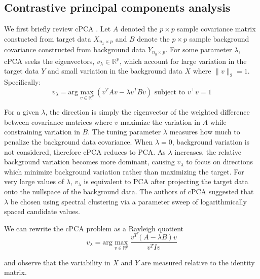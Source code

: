 \documentclass[12pt]{article}
\begin{document}
\subsection{Contrastive principal components analysis}
We first briefly review cPCA \cite{Abid}. Let $A$ denoted the $p\times p$ sample covariance matrix constucted from target data $X_{n_x \times p}$ and $B$ denote the $p\times p$ sample background covariance constructed from background data $Y_{n_y \times p}$. For some parameter $\lambda$, cPCA seeks the eigenvectors, $v_\lambda \in \mathbb{R}^p$, which account for large variation in the target data $Y$ and small variation in the background data $X$ where $\|v\|_2 = 1$. Specifically:  
\[v_\lambda = \text{arg}\max_{v \in \mathbb{R}^p}{\left(v^TAv - \lambda v^TBv\right)} \mbox{ subject to } v^\top  v = 1 \]

For a given $\lambda$, the direction is simply the eigenvector of the weighted difference between covariance matrices where $v$ maximize the variation in $A$ while constraining variation in $B$.
The tuning parameter $\lambda$ measures how much to penalize the background data covariance. When $\lambda = 0$, background variation is not considered, therefore cPCA reduces to PCA. As $\lambda$ increases, the relative background variation becomes more dominant, causing $v_\lambda$ to focus on directions which minimize background variation rather than maximizing the target. For very large values of $\lambda$, $v_\lambda$ is equivalent to PCA after projecting the target data onto the nullspace of the background data.  The authors of cPCA suggested that $\lambda$ be chosen using spectral clustering via a parameter sweep of logarithmically spaced candidate values.

We can rewrite the cPCA problem as a Rayleigh quotient
\[v_\lambda = \text{arg}\max_{v \in \mathbb{R}^p}{\frac{v^T\left(A - \lambda B\right)v}{v^T I v}}\]

and observe that the variability in $X$ and $Y$ are measured relative to the identity matrix.
\end{document}

